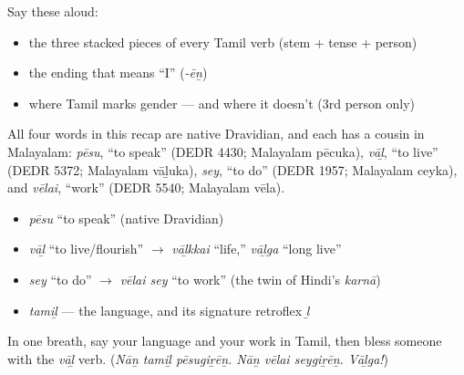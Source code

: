 \begin{grammarlens}[title={Grammar lens — the engine}]
Say these aloud:

\begin{itemize}
\raggedright
  \item the three stacked pieces of every Tamil verb (stem + tense + person)
  \item the ending that means \textquotedblleft{}I\textquotedblright{} (\emph{-ēṉ})
  \item where Tamil marks gender — and where it doesn't (3rd person only)
\end{itemize}
\end{grammarlens}

\begin{cousinweb}
All four words in this recap are native Dravidian, and each has a cousin in Malayalam: \emph{pēsu}, \textquotedblleft{}to speak\textquotedblright{} (DEDR 4430; Malayalam pēcuka), \emph{vāḻ}, \textquotedblleft{}to live\textquotedblright{} (DEDR 5372; Malayalam vāḻuka), \emph{sey}, \textquotedblleft{}to do\textquotedblright{} (DEDR 1957; Malayalam ceyka), and \emph{vēlai}, \textquotedblleft{}work\textquotedblright{} (DEDR 5540; Malayalam vēla).
\end{cousinweb}

\begin{grammarlens}[title={What you've built — roots you now carry}]
\begin{itemize}
\raggedright
  \item \emph{pēsu} \textquotedblleft{}to speak\textquotedblright{} (native Dravidian)
  \item \emph{vāḻ} \textquotedblleft{}to live/flourish\textquotedblright{} $\to$ \emph{vāḻkkai} \textquotedblleft{}life,\textquotedblright{} \emph{vāḻga} \textquotedblleft{}long live\textquotedblright{}
  \item \emph{sey} \textquotedblleft{}to do\textquotedblright{} $\to$ \emph{vēlai sey} \textquotedblleft{}to work\textquotedblright{} (the twin of Hindi's \emph{karnā})
  \item \emph{tamiḻ} — the language, and its signature retroflex \emph{ḻ}
\end{itemize}
\end{grammarlens}

\begin{tcolorbox}[breakable,colback=teal!4,colframe=teal!35!black,title={Before you move on}]
In one breath, say your language and your work in Tamil, then bless someone with the \emph{vāḻ} verb. (\emph{Nāṉ tamiḻ pēsugiṟēṉ. Nāṉ vēlai seygiṟēṉ. Vāḻga!})
\end{tcolorbox}
